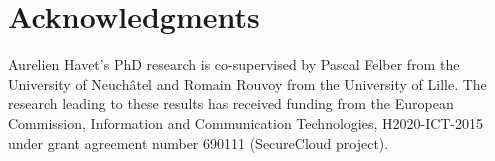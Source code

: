 \documentclass[10pt, conference]{IEEEtran}
\begin{document}










\section*{Acknowledgments}
Aurelien Havet's PhD research is co-supervised by Pascal Felber from the University of Neuchâtel and Romain Rouvoy from the University of Lille.
The research leading to these results has received funding from the European Commission, Information and Communication Technologies, H2020-ICT-2015 under grant agreement number 690111 (SecureCloud project).

{
\footnotesize


}
\end{document}
